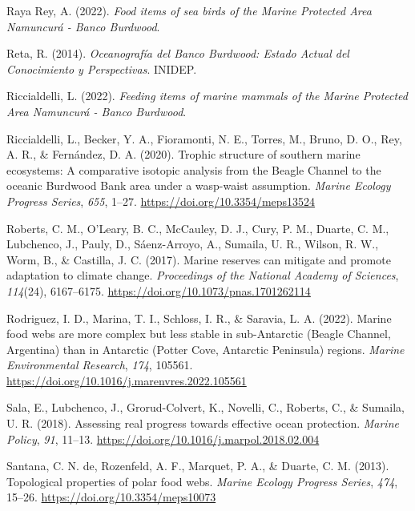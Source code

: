 \documentclass[preprint, 3p,
authoryear]{elsarticle} %
\newlength{\cslhangindent}
\newlength{\cslentryspacingunit} %
\newenvironment{CSLReferences}[2] %
 {%
  \setlength{\parindent}{0pt}
  \ifodd #1
  \let\oldpar\par
  \def\par{\hangindent=\cslhangindent\oldpar}
  \fi
  \setlength{\parskip}{#2\cslentryspacingunit}
 }%
 {}
\begin{document}
\begin{CSLReferences}{1}{0}
\leavevmode{}%
Raya Rey, A. (2022). \emph{Food items of sea birds of the {Marine
Protected Area Namuncurá} - {Banco Burdwood}}.

\leavevmode{}%
Reta, R. (2014). \emph{Oceanografía del {Banco Burdwood}: {Estado
Actual} del {Conocimiento} y {Perspectivas}}. {INIDEP}.

\leavevmode{}%
Riccialdelli, L. (2022). \emph{Feeding items of marine mammals of the
{Marine Protected Area Namuncurá} - {Banco Burdwood}}.

\leavevmode{}%
Riccialdelli, L., Becker, Y. A., Fioramonti, N. E., Torres, M., Bruno,
D. O., Rey, A. R., \& Fernández, D. A. (2020). Trophic structure of
southern marine ecosystems: A comparative isotopic analysis from the
{Beagle Channel} to the oceanic {Burdwood Bank} area under a wasp-waist
assumption. \emph{Marine Ecology Progress Series}, \emph{655}, 1--27.
\url{https://doi.org/10.3354/meps13524}

\leavevmode{}%
Roberts, C. M., O'Leary, B. C., McCauley, D. J., Cury, P. M., Duarte, C.
M., Lubchenco, J., Pauly, D., Sáenz-Arroyo, A., Sumaila, U. R., Wilson,
R. W., Worm, B., \& Castilla, J. C. (2017). Marine reserves can mitigate
and promote adaptation to climate change. \emph{Proceedings of the
National Academy of Sciences}, \emph{114}(24), 6167--6175.
\url{https://doi.org/10.1073/pnas.1701262114}

\leavevmode{}%
Rodriguez, I. D., Marina, T. I., Schloss, I. R., \& Saravia, L. A.
(2022). Marine food webs are more complex but less stable in
sub-{Antarctic} ({Beagle Channel}, {Argentina}) than in {Antarctic}
({Potter Cove}, {Antarctic Peninsula}) regions. \emph{Marine
Environmental Research}, \emph{174}, 105561.
\url{https://doi.org/10.1016/j.marenvres.2022.105561}

\leavevmode{}%
Sala, E., Lubchenco, J., Grorud-Colvert, K., Novelli, C., Roberts, C.,
\& Sumaila, U. R. (2018). Assessing real progress towards effective
ocean protection. \emph{Marine Policy}, \emph{91}, 11--13.
\url{https://doi.org/10.1016/j.marpol.2018.02.004}

\leavevmode{}%
Santana, C. N. de, Rozenfeld, A. F., Marquet, P. A., \& Duarte, C. M.
(2013). Topological properties of polar food webs. \emph{Marine Ecology
Progress Series}, \emph{474}, 15--26.
\url{https://doi.org/10.3354/meps10073}


\end{CSLReferences}
\end{document}
